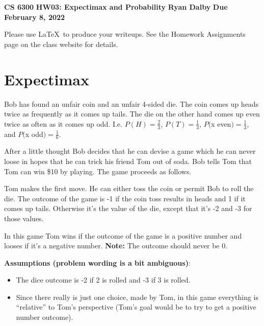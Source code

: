 \documentclass[12pt]{article}
\begin{document}
\begin{center}
  {\bf CS 6300} \hfill {\large\bf HW03: Expectimax and Probability} \hfill {\bf Ryan Dalby} \hfill {\bf Due February 8, 2022}
\end{center}

Please use \LaTeX\ to produce your writeups. See the Homework
Assignments page on the class website for details.

\section{Expectimax}

Bob has found an unfair coin and an unfair 4-sided die. The coin comes
up heads twice as frequently as it comes up tails. The die on the
other hand comes up even twice as often as it comes up odd. I.e. $P(H)
= \frac{2}{3}$, $P(T) = \frac{1}{3}$, $P($x even$) = \frac{1}{3}$, and
$P($x odd$) = \frac{1}{6}$.

After a little thought Bob decides that he can devise a game which he
can never loose in hopes that he can trick his friend Tom out of
soda. Bob tells Tom that Tom can win \$10 by playing. The game
proceeds as follows.

Tom makes the first move. He can either toss the coin or permit Bob to
roll the die. The outcome of the game is -1 if the coin toss results
in heads and 1 if it comes up tails. Otherwise it's the value of the
die, except that it's -2 and -3 for those values. 

In this game Tom wins if the outcome of the game is a positive number
and looses if it's a negative number. \textbf{Note:} The outcome
should never be 0.

\vspace{.2in}
\textbf{Assumptions (problem wording is a bit ambiguous)}:
\begin{itemize}
  \item 
  The dice outcome is -2 if 2 is rolled and -3 if 3 is rolled. 

  \item 
  Since there really is just one choice, made by Tom, in this game everything is ``relative'' to Tom's perspective (Tom's goal would be to try to get a positive number outcome).
\end{itemize}
\end{document}
